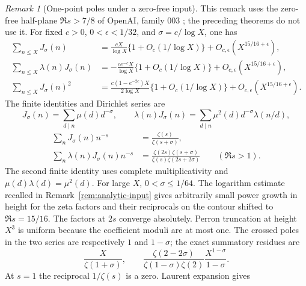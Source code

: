 \documentclass[11pt]{article}
\theoremstyle{definition}
\theoremstyle{remark}
\newtheorem{remark}[theorem]{Remark}
\numberwithin{equation}{section}
\begin{document}
\begin{remark}[One-point poles under a zero-free input]\label{rem:j-poles}
This remark uses the zero-free half-plane $\Re s>7/8$ of OpenAI, family 003 \cite{OpenAI003}; the
preceding theorems do not use it. For fixed $c>0$, $0<\epsilon<1/32$, and $\sigma=c/\log X$, one has
\begin{equation}\label{eq:j-poles}
\begin{aligned}
 \sum_{n\le X}J_\sigma(n)&=\frac{cX}{\log X}\{1+O_c(1/\log X)\}
                  +O_{c,\epsilon}(X^{15/16+\epsilon}),\\
 \sum_{n\le X}\lambda(n)J_\sigma(n)&=-\frac{ce^{-c}X}{\log X}\{1+O_c(1/\log X)\}
                  +O_{c,\epsilon}(X^{15/16+\epsilon}),\\
 \sum_{n\le X}J_\sigma(n)^2&=\frac{c(1-e^{-2c})X}{2\log X}\{1+O_c(1/\log X)\}
                  +O_{c,\epsilon}(X^{15/16+\epsilon}).
\end{aligned}
\end{equation}
The finite identities and Dirichlet series are
\begin{equation}\label{eq:j-finite}
 J_\sigma(n)=\sum_{d\mid n}\mu(d)d^{-\sigma},\qquad
 \lambda(n)J_\sigma(n)=\sum_{d\mid n}\mu^2(d)d^{-\sigma}\lambda(n/d),
\end{equation}
\begin{equation}\label{eq:j-series}
\begin{aligned}
 \sum_nJ_\sigma(n)n^{-s}&=\frac{\zeta(s)}{\zeta(s+\sigma)},\\
 \sum_n\lambda(n)J_\sigma(n)n^{-s}&=
 \frac{\zeta(2s)\zeta(s+\sigma)}{\zeta(s)\zeta(2s+2\sigma)}\qquad(\Re s>1).
\end{aligned}
\end{equation}
The second finite identity uses complete multiplicativity and $\mu(d)\lambda(d)=\mu^2(d)$.
For large $X$, $0<\sigma\le1/64$. The logarithm estimate recalled in
Remark~\ref{rem:analytic-input} gives arbitrarily small power growth in height for the zeta factors
and their reciprocals on the contour shifted to $\Re s=15/16$. The factors at $2s$ converge
absolutely. Perron truncation at height $X^3$ is uniform because the coefficient moduli are at most one.
The crossed poles in the two series are respectively $1$ and $1-\sigma$; the exact summatory residues are
\begin{equation}\label{eq:j-residues}
 \frac X{\zeta(1+\sigma)},\qquad
 \frac{\zeta(2-2\sigma)}{\zeta(1-\sigma)\zeta(2)}
 \frac{X^{1-\sigma}}{1-\sigma}.
\end{equation}
At $s=1$ the reciprocal $1/\zeta(s)$ is a zero. Laurent expansion gives

\end{remark}
\end{document}
